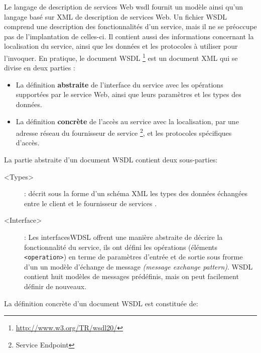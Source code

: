   

  Le langage de description de services Web \acrshort{wsdl}
  \cite{chinnici2007web} fournit un modèle ainsi qu'un langage basé
  sur \textsc{XML} de description de services Web. Un fichier
  \textsc{WSDL} comprend une description des fonctionnalités d'un
  service, mais il ne se préoccupe pas de l'implantation de celles-ci.
  Il contient aussi des informations concernant la localisation du
  service, ainsi que les données et les protocoles à utiliser pour
  l'invoquer. En pratique, le document \textsc{WSDL}
  \footnote{\url{http://www.w3.org/TR/wsdl20/}} est un document
  \textsc{XML} qui se divise en deux parties \cite{elie2010} :

  \SpecialItem
  \begin{itemize}
  \item La définition \textbf{abstraite} de l'interface du service
    avec les opérations supportées par le service Web, ainsi que leurs
    paramètres et les types des données.

  \item La définition \textbf{concrète} de l'accès au service avec la
    localisation, par une adresse réseau du fournisseur de service
    \footnote{Service Endpoint}, et les protocoles spécifiques
    d'accès.
  \end{itemize}

  La partie abstraite d'un document \textsc{WSDL} contient deux
  sous-parties:

  \SpecialItem
  \renewcommand{\descriptionlabel}[1]{\hspace{1.5cm}\texttt{#1}}
  \begin{description}
  \item[<Types>]: décrit sous la forme d'un schéma \textsc{XML} les
    types des données échangées entre le client et le fournisseur de
    services \cite{part20012}.

  \item[<Interface>]: Les interfaces\textsc{WDSL} offrent une manière
    abstraite de décrire la fonctionnalité du service, ils ont défini
    les opérations (éléments \texttt{<operation>}) en terme de
    paramètres d'entrée et de sortie sous frorme d'un un modèle
    d'échange de message \textit{(message exchange
      pattern)}. \textsc{WSDL} contient huit modèles de messages
    prédéfinis, mais on peut facilement définir de nouveaux.
  \end{description}

  La définition concrète d'un document \textsc{WSDL} est constituée
  de:

